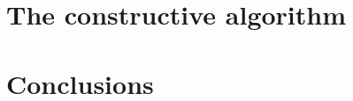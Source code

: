 \documentclass{beamer}
\begin{document}
	\section{The constructive algorithm}
	
	\section{Conclusions}
		
\end{document}
